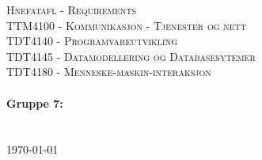 \begin{titlepage}
\begin{center} 

\vspace*{3cm}
\textsc{\Huge Hnefatafl - Requirements}\\[0.7cm]
\textsc{\LARGE TTM4100 - Kommunikasjon - Tjenester og nett}\\[0.2cm]
\textsc{\LARGE TDT4140 - Programvareutvikling}\\[0.2cm]
\textsc{\LARGE TDT4145 - Datamodellering og Databasesytemer}\\[0.2cm]
\textsc{\LARGE TDT4180 - Menneske-maskin-interaksjon}\\[0.2cm]
\\[1.6cm]

\textbf{\Large Gruppe 7:} \\[0.2cm]
 \\
\\[1cm] 

\today

\end{center}
\end{titlepage}

